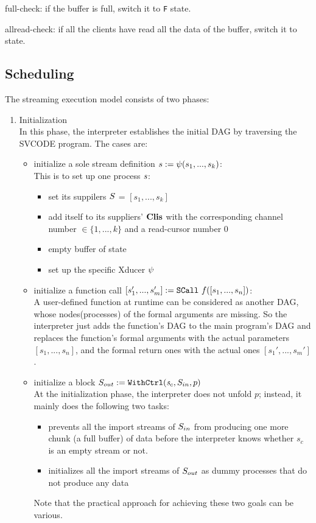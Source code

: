 full-check: if the buffer is full, switch it to \draining \texttt{F} state.

allread-check: if all the clients have read all the data of the buffer, switch it to \filling state.


\subsection{Scheduling}
The streaming execution model consists of two phases:
\begin{enumerate}[(1)]
\item Initialization \\
In this phase, the interpreter establishes the initial DAG by traversing the SVCODE program. The cases are:
\begin{itemize}
	\item initialize a sole stream definition $\sdef{s}{\lcall(s_1,...,s_k)}$: \\
	This is to set up one process $\s$:
	\begin{itemize}
		\item set its suppilers $\S$ = $[s_1,...,s_k]$
		\item add itself to its suppliers' $\clis$ with the corresponding channel number $\in \{1,...,k\}$ and a read-cursor number 0
		\item empty buffer of state \filling
		\item set up the specific Xducer $\lcall$
	\end{itemize}

	
	\item initialize a function call  $\scall{f}{[s_1,...,s_n]}{[s_1',...,s_m']}$: \\
	A user-defined function at runtime can be considered as another DAG, whose nodes(processes) of the formal arguments are missing. 
	So the interpreter just adds the function's DAG to the main program's DAG 
	and replaces the function's formal arguments with the actual parameters $[s_1,...,s_n]$, and the formal return ones with the actual ones $[s_1',...,s_m']$.  

	
	\item initialize a \wc block $\withctrl{\s_c}{p}{\Sin}{\Sout}$ \\
	At the initialization phase, the interpreter does not unfold $p$; instead, it mainly does the following two tasks:	
	\begin{itemize}
		\item prevents all the import streams of $\Sin$ from producing one more chunk (a full buffer) of data before the interpreter knows whether $s_c$ is an empty stream or not.
		\item initializes all the import streams of $\Sout$ as dummy processes that do not produce any data
	\end{itemize}
	Note that the practical approach for achieving these two goals can be various.
	

\end{itemize}
\end{enumerate}
